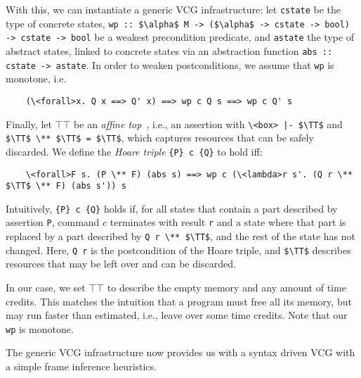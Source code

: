 \documentclass[acmsmall]{acmart}
\newcommand{\is}{\lstinline[language=isabelle]}
\begin{document}
With this, we can instantiate a generic VCG infrastructure:
let \is{cstate} be the type of concrete states, \is{wp :: $\alpha$ M -> ($\alpha$ -> cstate -> bool) -> cstate -> bool} be a weakest precondition predicate,
and \is{astate} the type of abstract states, linked to concrete states via an abstraction function \is{abs :: cstate -> astate}.
In order to weaken postconditions, we assume that \is{wp} is monotone, i.e.
\begin{lstlisting}
    (\<forall>x. Q x ==> Q' x) ==> wp c Q s ==> wp c Q' s
\end{lstlisting}
\begin{comment}
distributes over conjunctions, i.e.,
\begin{lstlisting}
    wp c Q_1 s \and wp c Q_2 s ==> wp c (\<lambda>r s'. Q_1 r s' \and Q_2 r s') s
\end{lstlisting}
\end{comment}
%
\newcommand{\TT}{\ensuremath{\top\!\!\!\top}}
%
Finally, let $\TT$ be an \emph{affine top}~\cite{Chargueraud20}, i.e., an assertion with \is{\<box> |- $\TT$} and \is{$\TT$ \** $\TT$ = $\TT$}, which
captures resources that can be safely discarded. 
We define the \emph{Hoare triple} \is${P} c {Q}$ to hold iff:
\begin{lstlisting}
    \<forall>F s. (P \** F) (abs s) ==> wp c (\<lambda>r s'. (Q r \** $\TT$ \** F) (abs s')) s
\end{lstlisting}
Intuitively, \is${P} c {Q}$ holds if, for all states that contain a part described by assertion \is$P$,
command $c$ terminates with result \is$r$ and a state where that part 
is replaced by a part described by \is{Q r \** $\TT$}, and the rest of the state has not changed.
Here, \is$Q r$ is the postcondition of the Hoare triple, and \is{$\TT$} describes resources that may be left over and can be discarded. 

In our case, we set $\TT$ to describe the empty memory and any amount of time credits. This matches the intuition that a program must free all its memory, but may run faster than estimated, i.e., leave over some time credits.
Note that our \is{wp} is monotone.


The generic VCG infrastructure now provides us with a syntax driven VCG with a simple frame inference heuristics.




\end{document}
